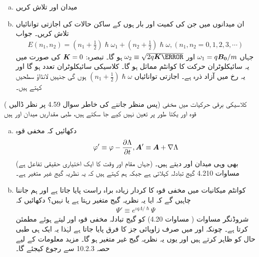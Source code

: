 \begin{enumerate}[a.]
\item  میدان  اور  تلاش کریں 
\item ان میدانوں میں جن کی کمیت  اور بار  ہوں کے ساکن حالات کی اجازتی توانائیاں تلاش کریں۔ جواب
\begin{align}
    E(n_1,n_2)=(n_1+\frac{1}{2})\hslash\omega_1+(n_2+\frac{1}{2})\hslash\omega,       (n_1,n_2=0,1,2,3,\cdots)
\end{align}
جہاں \(\omega_1=q{{\boldsymbol{B_0}}}/m\) اور   \( \omega_2\equiv\sqrt{2q\kvec{K}\m}  \) ہو گا۔ تبصرہ: \( {{\boldsymbol{K}}} = 0 \) کی صورت میں یہ سائیکلوٹران حرکت کا کوانٹم مماثل ہو گا۔ کلاسیکی سائیکلوٹران تعدد  ہو گا اور یہ  رخ میں آزاد ذرہ ہے۔ اجازتی توانائیاں \((n_1+\frac{1}{2})\hslash\omega\) ہوں گی جنہیں لانڈاؤ سطحیں کہتے ہیں۔
\end{enumerate}
( پس منظر جاننے کی خاطر سوال 4.59 پر نظر ڈالیں) کلاسیکی برقی حرکیات میں مخفی قوہ  اور  یکتا طور پر تعین نہیں کیے جا سکتے ہیں، طبی مقداریں میدان  اور  ہیں 
\begin{enumerate}[a.]
\item  دکھائیں کہ مخفی قوہ 
\begin{align}
    \varphi'\equiv\varphi-\frac{\partial\Lambda}{\partial t},  {{\boldsymbol{A}}}'\equiv{\ensuremath{{\boldsymbol{A}}}}+\nabla\Lambda
\end{align}
(جہاں مقام اور وقت کا  ایک اختیاری حقیقی تفاعل ہے) بھی وہی میدان  اور  دیتے ہیں۔ مساوات 4.210 گیج تبادلہ کہلاتی ہے جبکہ ہم کہتے ہیں کہ یہ نظریہ گیج غیر متغیر ہے۔
\item کوانٹم میکانیات میں مخفی قوہ کا کردار زیادہ براہ راست پایا جاتا ہے اور ہم جاننا چاہیں گے کہ ایا یہ نظریہ گیج متغیر رہتا ہے یا نہیں؟ دکھائیں کہ 
\begin{align}
    \Psi'\equiv e^{\iota q \Lambda/\hslash}\Psi
\end{align}
شروڈنگر مساوات ( مساوات 4.20) کو گیج تبادلہ مخفی قوہ   اور  لیتے ہوئے مطمئن کرتا ہے۔ چونکہ  اور  میں صرف زاویائی جز کا فرق پایا جاتا ہے لہٰذا یہ ایک ہی طبی حال کو ظاہر کرتے ہیں اور یوں یہ نظریہ گیج غیر متغیر ہو گا۔ مزید معلومات کے لیے حصہ 10.2.3 سے رجوع کیجئے گا۔
\end{enumerate}



